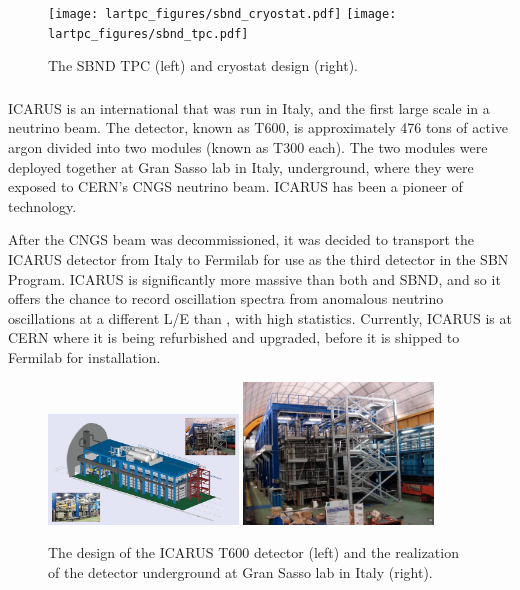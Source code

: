 \begin{figure}[htb]
  \centering
  \texttt{[image: lartpc\_figures/sbnd\_cryostat.pdf]}
  \texttt{[image: lartpc\_figures/sbnd\_tpc.pdf]}
  \caption[\sbnd Design]{The SBND TPC (left) and cryostat design (right).}
  \label{fig:sbnd_det}
\end{figure}


\subsubsection{\label{subsec:icarus} \icarus}

ICARUS is an international \lartpc that was run in Italy, and the first large scale \lartpc in a neutrino beam.  The detector, known as T600, is approximately 476 tons of active argon divided into two modules (known as T300 each).  The two modules were deployed together at Gran Sasso lab in Italy, underground, where they were exposed to CERN's CNGS neutrino beam.  ICARUS has been a pioneer of \lartpc technology.

After the CNGS beam was decommissioned, it was decided to transport the ICARUS detector from Italy to Fermilab for use as the third detector in the SBN Program.  ICARUS is significantly more massive than both \uboone and SBND, and so it offers the chance to record oscillation spectra from anomalous neutrino oscillations at a different L/E than \uboone, with high statistics.  Currently, ICARUS is at CERN where it is being refurbished and upgraded, before it is shipped to Fermilab for installation.

\begin{figure}[htb]
  \centering
  \includegraphics[width=0.45\textwidth]{lartpc_figures/icarus.jpg}
  \includegraphics[width=0.45\textwidth]{lartpc_figures/icarus_real.png}
  \caption[ICARUS T600]{The design of the ICARUS T600 detector (left) and the realization of the detector underground at Gran Sasso lab in Italy (right).}
  \label{fig:icarus}
\end{figure}


\FloatBarrier

